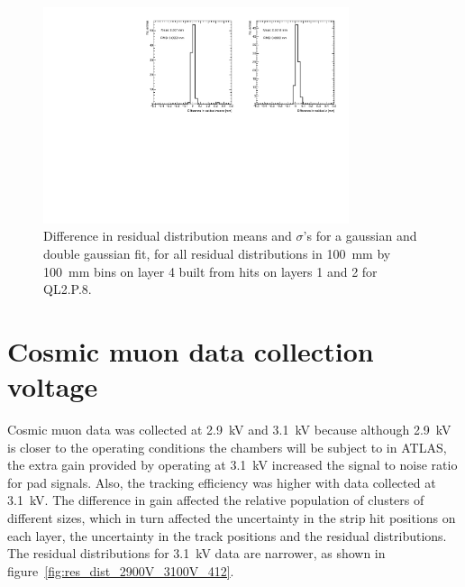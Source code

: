 \begin{figure}
    \centering
    \includegraphics[width = 0.8\textwidth]{figures/figure_compare_residual_fits_QL2P08_3100V_2021-06-18_no_dnl_minus_QL2P08_3100V_2021-07-19_doub_gaus_log_scale_layer4_fixedlayers12.pdf} 
    \caption{Difference in residual distribution means and $\sigma$'s for a gaussian and double gaussian fit, for all residual distributions in \SI{100}{\milli\meter} by \SI{100}{\milli\meter} bins on layer 4 built from hits on layers 1 and 2 for QL2.P.8.}
    \label{fig:double_gaussian_compare_fits}
\end{figure}

\section{Cosmic muon data collection voltage}
\label{appendix:systematics_2900V_vs_3100V}


Cosmic muon data was collected at 2.9~kV and 3.1~kV because although 2.9~kV is closer to the operating conditions the chambers will be subject to in ATLAS, the extra gain provided by operating at 3.1~kV increased the signal to noise ratio for pad signals. Also, the tracking efficiency was higher with data collected at 3.1~kV. The difference in gain affected the relative population of clusters of different sizes, which in turn affected the uncertainty in the strip hit positions on each layer, the uncertainty in the track positions and the residual distributions. The residual distributions for 3.1~kV data are narrower, as shown in figure~\ref{fig:res_dist_2900V_3100V_412}.

